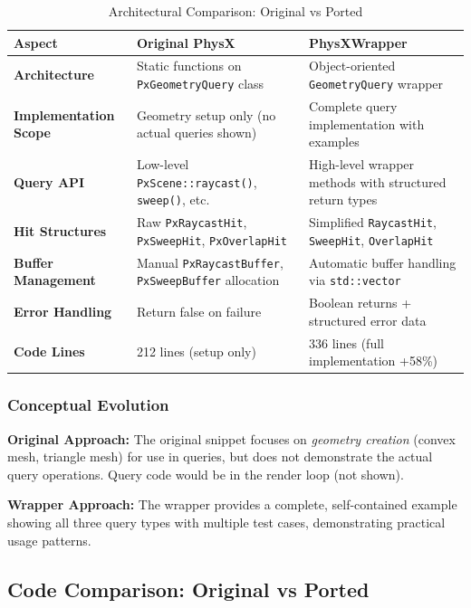 \begin{table}[h]
\centering
\begin{tabular}{|l|p{5.5cm}|p{5.5cm}|}
\hline
\textbf{Aspect} & \textbf{Original PhysX} & \textbf{PhysXWrapper} \\
\hline
\textbf{Architecture} & Static functions on \texttt{PxGeometryQuery} class & Object-oriented \texttt{GeometryQuery} wrapper \\
\hline
\textbf{Implementation Scope} & Geometry setup only (no actual queries shown) & Complete query implementation with examples \\
\hline
\textbf{Query API} & Low-level \texttt{PxScene::raycast()}, \texttt{sweep()}, etc. & High-level wrapper methods with structured return types \\
\hline
\textbf{Hit Structures} & Raw \texttt{PxRaycastHit}, \texttt{PxSweepHit}, \texttt{PxOverlapHit} & Simplified \texttt{RaycastHit}, \texttt{SweepHit}, \texttt{OverlapHit} \\
\hline
\textbf{Buffer Management} & Manual \texttt{PxRaycastBuffer}, \texttt{PxSweepBuffer} allocation & Automatic buffer handling via \texttt{std::vector} \\
\hline
\textbf{Error Handling} & Return false on failure & Boolean returns + structured error data \\
\hline
\textbf{Code Lines} & 212 lines (setup only) & 336 lines (full implementation +58\%) \\
\hline
\end{tabular}
\caption{Architectural Comparison: Original vs Ported}
\end{table}

\subsubsection{Conceptual Evolution}

\textbf{Original Approach:} The original snippet focuses on \textit{geometry creation} (convex mesh, triangle mesh) for use in queries, but does not demonstrate the actual query operations. Query code would be in the render loop (not shown).

\textbf{Wrapper Approach:} The wrapper provides a complete, self-contained example showing all three query types with multiple test cases, demonstrating practical usage patterns.


\subsection{Code Comparison: Original vs Ported}

